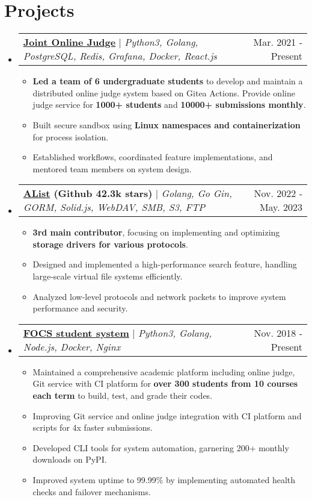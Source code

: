 \documentclass[letterpaper,11pt]{article}
\makeatletter
\newcommand{\resumeItem}[1]{
  \item\small{
    {#1 \vspace{-2pt}}
  }
}
\newcommand{\resumeProjectHeader}[2]{
    \item
    \begin{tabular*}{0.98\textwidth}{l@{\extracolsep{\fill}}r}
      \small#1 & #2 \\
    \end{tabular*}\vspace{-7pt}
}
\newcommand{\resumeSubHeaderListStart}{\begin{itemize}[leftmargin=0.15in, label={}]}
\newcommand{\resumeSubHeaderListEnd}{\end{itemize}}
\newcommand{\resumeItemListStart}{\begin{itemize}}
\newcommand{\resumeItemListEnd}{\end{itemize}\vspace{-5pt}}
\makeatother
\begin{document}
\section{Projects}
    \resumeSubHeaderListStart
      \resumeProjectHeader
        {\href{https://github.com/joint-online-judge}{\textbf{Joint Online Judge}} $|$ \emph{Python3, Golang, PostgreSQL, Redis, Grafana, Docker, React.js}}{Mar. 2021 - Present}
        \resumeItemListStart
          \resumeItem{\textbf{Led a team of 6 undergraduate students} to develop and maintain a distributed online judge system based on Gitea Actions. Provide online judge service for \textbf{1000+ students} and \textbf{10000+ submissions monthly}.}
          \resumeItem{Built secure sandbox using \textbf{Linux namespaces and containerization} for process isolation.}
          \resumeItem{Established workflows, coordinated feature implementations, and mentored team members on system design.}
        \resumeItemListEnd
      \resumeProjectHeader
        {\textbf{\href{https://github.com/alist-org/alist}{AList} (Github 42.3k stars)} $|$ \emph{Golang, Go Gin, GORM, Solid.js, WebDAV, SMB, S3, FTP}}{Nov. 2022 - May. 2023}
        \resumeItemListStart
          \resumeItem{\textbf{3rd main contributor}, focusing on implementing and optimizing \textbf{storage drivers for various protocols}.}
          \resumeItem{Designed and implemented a high-performance search feature, handling large-scale virtual file systems efficiently.}
          \resumeItem{Analyzed low-level protocols and network packets to improve system performance and security.}
        \resumeItemListEnd
      \resumeProjectHeader
        {\href{https://gist.github.com/BoYanZh/fc4469c20fd6adf42c212114532aaac0}{\textbf{FOCS student system}} $|$ \emph{Python3, Golang, Node.js, Docker, Nginx}}{Nov. 2018 - Present}
        \resumeItemListStart
          \resumeItem{Maintained a comprehensive academic platform including online judge, Git service with CI platform for \textbf{over 300 students from 10 courses each term} to build, test, and grade their codes.}
          \resumeItem{Improving Git service and online judge integration with CI platform and scripts for 4x faster submissions.}
          \resumeItem{Developed CLI tools for system automation, garnering 200+ monthly downloads on PyPI.}
          \resumeItem{Improved system uptime to 99.99\% by implementing automated health checks and failover mechanisms.}
        \resumeItemListEnd
    \resumeSubHeaderListEnd
\end{document}
